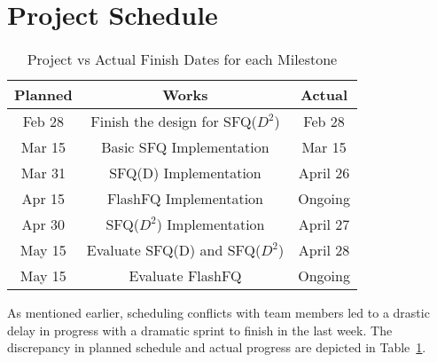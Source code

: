 \section{Project Schedule}

\begin{table}[t]
	\centering
	\tabcolsep=0.11cm
	\begin{tabular}{|c|c|c|}
		\hline
		Planned & Works & Actual\\
		\hline
		Feb 28 & Finish the design for SFQ($D^2$) & Feb 28\\ 
		\hline
		Mar 15 & Basic SFQ Implementation & Mar 15\\
		\hline
		Mar 31 & SFQ(D) Implementation & April 26\\
		\hline
		Apr 15 & FlashFQ Implementation & Ongoing \\
		\hline
		Apr 30 & SFQ($D^2$) Implementation & April 27\\
		\hline
		May 15 & Evaluate SFQ(D) and SFQ($D^2$) & April 28\\
		\hline
                May 15 & Evaluate FlashFQ  & Ongoing\\
		\hline

	\end{tabular}
	\caption{Project vs Actual Finish Dates for each Milestone}
	\vspace{-12pt}
	\label{table:traces}
\end{table}

As mentioned earlier, scheduling conflicts with team members led to a
drastic delay in progress with a dramatic sprint to finish in the last
week. The discrepancy in planned schedule and actual progress are
depicted in Table~\ref{table:traces}.
